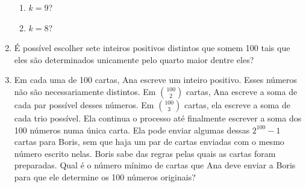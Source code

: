 \documentclass{article}
\begin{document}
\begin{enumerate}
    \begin{enumerate}
        \item $k=9$?

        \item $k=8$?
    \end{enumerate}

    \item É possível escolher sete inteiros positivos distintos que somem 100 tais que eles são determinados unicamente pelo quarto maior dentre eles?

    \item Em cada uma de 100 cartas, Ana escreve um inteiro positivo. Esses números não são necessariamente distintos. Em $\binom{100}{2}$ cartas, Ana escreve a soma de cada par possível desses números. Em $\binom{100}{3}$ cartas, ela escreve a soma de cada trio possível. Ela continua o processo até finalmente escrever a soma dos 100 números numa única carta. Ela pode enviar algumas dessas $2^{100}-1$ cartas para Boris, sem que haja um par de cartas enviadas com o mesmo número escrito nelas. Boris sabe das regras pelas quais as cartas foram preparadas. Qual é o número mínimo de cartas que Ana deve enviar a Boris para que ele determine os 100 números originais?
\end{enumerate}
\end{document}
